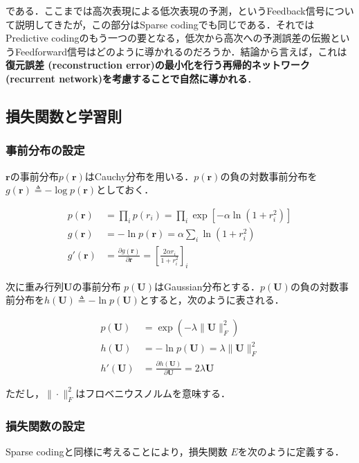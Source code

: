 である．ここまでは高次表現による低次表現の予測，というFeedback信号について説明してきたが，この部分はSparse codingでも同じである．それではPredictive codingのもう一つの要となる，低次から高次への予測誤差の伝搬というFeedforward信号はどのように導かれるのだろうか．結論から言えば，これは\textbf{復元誤差 (reconstruction error)の最小化を行う再帰的ネットワーク (recurrent network)を考慮することで自然に導かれる}．
\subsection{損失関数と学習則}
\subsubsection{事前分布の設定}
$\mathbf{r}$の事前分布$p(\mathbf{r})$はCauchy分布を用いる．$p(\mathbf{r})$の負の対数事前分布を$g(\mathbf{r})\triangleq-\log p(\mathbf{r})$としておく．


\begin{align}
p(\mathbf{r})&=\prod_i p(r_i)=\prod_i \exp\left[-\alpha \ln(1+r_i^2)\right]\\
g(\mathbf{r})&=-\ln p(\mathbf{r})=\alpha \sum_i \ln(1+r_i^2)\\
g'(\mathbf{r})&=\frac{\partial g(\mathbf{r})}{\partial \mathbf{r}}=\left[\frac{2\alpha r_i}{1+r_i^2}\right]_i
\end{align}


次に重み行列$\mathbf{U}$の事前分布 $p(\mathbf{U})$はGaussian分布とする．$p(\mathbf{U})$の負の対数事前分布を$h(\mathbf{U})\triangleq-\ln p(\mathbf{U})$とすると，次のように表される．


\begin{align}
p(\mathbf{U})&=\exp(-\lambda\|\mathbf{U}\|^2_F)\\
h(\mathbf{U})&=-\ln p(\mathbf{U})=\lambda\|\mathbf{U}\|^2_F\\
h'(\mathbf{U})&=\frac{\partial h(\mathbf{U})}{\partial \mathbf{U}}=2\lambda \mathbf{U}
\end{align}


ただし，$\|\cdot \| _ F^2$はフロベニウスノルムを意味する．

\subsubsection{損失関数の設定}
Sparse codingと同様に考えることにより，損失関数 $E$を次のように定義する．


